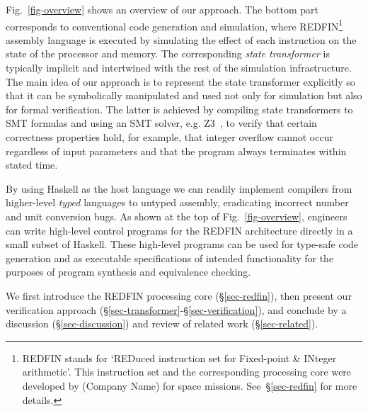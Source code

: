 Fig.~\ref{fig-overview} shows an overview of our approach. The bottom part
corresponds to conventional code generation and simulation, where
REDFIN\footnote{REDFIN stands for `REDuced instruction set for Fixed-point \&
INteger arithmetic'. This instruction set and the corresponding processing core
were developed by (Company Name) for space missions.
See~\S\ref{sec-redfin} for more details.} assembly language is executed by
simulating the effect of each instruction on the state of the processor and memory.
The corresponding \emph{state transformer} is typically implicit and intertwined
with the rest of the simulation infrastructure. The main idea of our approach is
to represent the state transformer explicitly so that it can be symbolically
manipulated and used not only for simulation but also for formal verification.
The latter is achieved by compiling state transformers to SMT formulas and using
an SMT solver, e.g. Z3~\cite{de2008z3}, to verify that certain correctness
properties hold, for example, that integer overflow cannot occur regardless of
input parameters and that the program always terminates within stated time.

By using Haskell as the host language we can readily implement compilers from
higher-level \emph{typed} languages to untyped assembly, eradicating incorrect
number and unit conversion bugs. As shown at the top of Fig.~\ref{fig-overview},
engineers can write high-level control programs for the REDFIN architecture
directly in a small subset of Haskell. These high-level programs can be used for
type-safe code generation and as executable specifications of intended
functionality for the purposes of program synthesis and equivalence checking.


We first introduce the REDFIN processing core (\S\ref{sec-redfin}), then
present our verification approach (\S\ref{sec-transformer}-\S\ref{sec-verification}),
and conclude by a discussion (\S\ref{sec-discussion}) and review of related work
(\S\ref{sec-related}).
